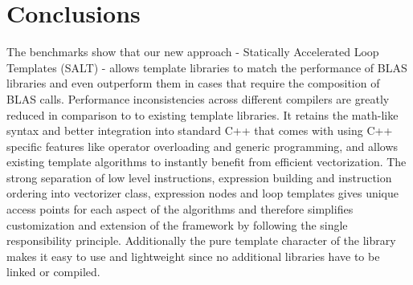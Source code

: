\documentclass[12pt]{article}
\begin{document}
\section{Conclusions}
The benchmarks show that our new approach - Statically Accelerated Loop Templates (SALT) - allows template libraries to match the
performance of BLAS libraries and even outperform them in cases that require
the composition of BLAS calls. Performance inconsistencies across different
compilers are greatly reduced in comparison to to existing template libraries.
It retains the math-like syntax and better integration into standard C++ that
comes with using C++ specific features like operator overloading and generic
programming, and allows existing template algorithms to instantly benefit
from efficient vectorization.
The strong separation of low level instructions, expression building and
instruction ordering into vectorizer class, expression nodes and loop templates
gives unique access points for each aspect of the algorithms and therefore
simplifies customization and extension of the framework by following the single
responsibility principle.
Additionally the pure template character of the library makes it easy to use
and lightweight since no additional libraries have to be linked or compiled.

{}

\end{document}
